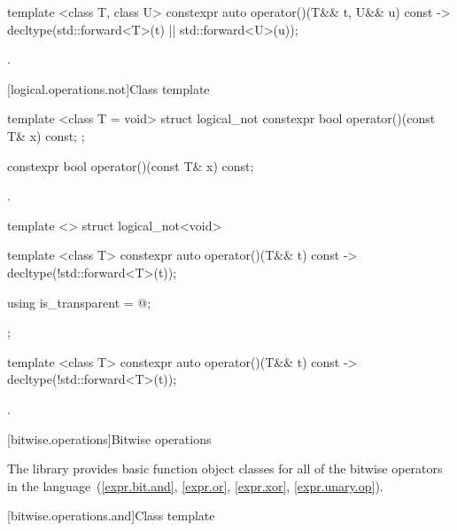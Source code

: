 %
\begin{itemdecl}
template <class T, class U> constexpr auto operator()(T&& t, U&& u) const
    -> decltype(std::forward<T>(t) || std::forward<U>(u));
\end{itemdecl}

\begin{itemdescr}
\pnum\returns {}.
\end{itemdescr}

[logical.operations.not]{Class template }

%
\begin{itemdecl}
template <class T = void> struct logical_not {
  constexpr bool operator()(const T& x) const;
};
\end{itemdecl}

%
\begin{itemdecl}
constexpr bool operator()(const T& x) const;
\end{itemdecl}

\begin{itemdescr}
\pnum\returns {}.
\end{itemdescr}

%
\begin{itemdecl}
template <> struct logical_not<void> {
  template <class T> constexpr auto operator()(T&& t) const
    -> decltype(!std::forward<T>(t));

  using is_transparent = @\unspec@;
};
\end{itemdecl}

%
\begin{itemdecl}
template <class T> constexpr auto operator()(T&& t) const
    -> decltype(!std::forward<T>(t));
\end{itemdecl}

\begin{itemdescr}
\pnum\returns {}.
\end{itemdescr}


[bitwise.operations]{Bitwise operations}

\pnum
The library provides basic function object classes for all of the bitwise
operators in the language~(\ref{expr.bit.and}, \ref{expr.or},
\ref{expr.xor}, \ref{expr.unary.op}).

[bitwise.operations.and]{Class template }


